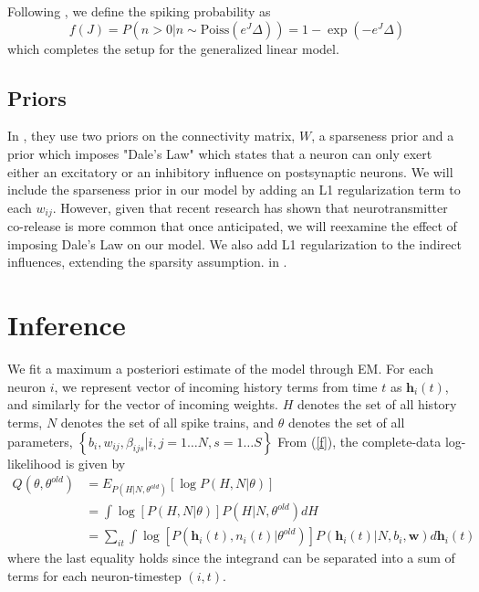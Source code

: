 \documentclass{article}
\begin{document}
Following \citep{mishchencko2011}, we define the spiking probability as 
\begin{equation} \label{f}
f(J) = P\left(n>0 | n \sim \text{Poiss}(e^J\Delta)\right) = 1 - \exp(-e^J\Delta)
\end{equation}
which completes the setup for the generalized linear model. 

\subsection{Priors}
In \citep{mishchencko2011}, they use two priors on the connectivity
matrix, $W$, a sparseness prior and a prior which imposes "Dale's
Law" which states that a neuron can only exert either an excitatory
or an inhibitory influence on postsynaptic neurons. We will include
the sparseness prior in our model by adding an L1 regularization
term to each $w_{ij}$. However, given that recent research has shown
that neurotransmitter co-release is more common that once anticipated,
we will reexamine the effect of imposing Dale's Law on our model.
We also add L1 regularization to the indirect influences, extending
the sparsity assumption.
in \citep{patnaik2011}.

\section{Inference}
We fit a maximum a posteriori estimate of the model through EM.  For
each neuron $i$, we represent vector of incoming history terms from
time $t$ as $\mathbf{h}_i(t)$, and similarly for the vector of
incoming weights. $H$ denotes the set of all history terms, $N$
denotes the set of all spike trains, and $\theta$ denotes the set
of all parameters,
$\left\{ b_i, w_{ij}, \beta_{ijs} | i,j = 1 \ldots N, s = 1 \ldots S \right\}$
From (\ref{f}), the complete-data log-likelihood is given by
\begin{align*} \label{Q}  
Q(\theta,\theta^{old}) &= E_{P(H|N,\theta^{old})} \left[ \log{P(H,N|\theta)} \right] 
\\                     &= \int{ \log\left[P(H,N|\theta)\right] P(H|N,\theta^{old}) dH }
\\                     &= \sum_{it} \int \log\left[P(\mathbf{h}_i(t),n_i(t)|\theta^{old})\right] P(\mathbf{h}_i(t)|N,b_i,\mathbf{w}) d\mathbf{h}_i(t)
\end{align*}
where the last equality holds since the integrand can be separated
into a sum of terms for each neuron-timestep $(i,t)$.
\end{document}
